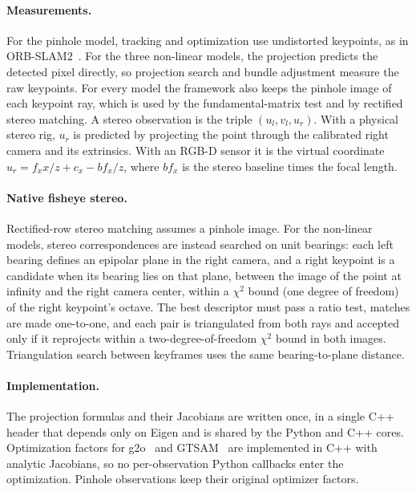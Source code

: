 \documentclass{article}
\let\oldparagraph\paragraph
\renewcommand{\paragraph}[1]{\oldparagraph{#1}\mbox{}}
\begin{document}
\paragraph{Measurements.} For the pinhole model, tracking and optimization use undistorted keypoints, as in ORB-SLAM2~\cite{ORB_SLAM2}. For the three non-linear models, the projection predicts the detected pixel directly, so projection search and bundle adjustment measure the raw keypoints. For every model the framework also keeps the pinhole image of each keypoint ray, which is used by the fundamental-matrix test and by rectified stereo matching. A stereo observation is the triple $(u_l, v_l, u_r)$. With a physical stereo rig, $u_r$ is predicted by projecting the point through the calibrated right camera and its extrinsics. With an RGB-D sensor it is the virtual coordinate $u_r = f_x x/z + c_x - b f_x / z$, where $b f_x$ is the stereo baseline times the focal length.

\paragraph{Native fisheye stereo.} Rectified-row stereo matching assumes a pinhole image. For the non-linear models, stereo correspondences are instead searched on unit bearings: each left bearing defines an epipolar plane in the right camera, and a right keypoint is a candidate when its bearing lies on that plane, between the image of the point at infinity and the right camera center, within a $\chi^2$ bound (one degree of freedom) of the right keypoint's octave. The best descriptor must pass a ratio test, matches are made one-to-one, and each pair is triangulated from both rays and accepted only if it reprojects within a two-degree-of-freedom $\chi^2$ bound in both images. Triangulation search between keyframes uses the same bearing-to-plane distance.

\paragraph{Implementation.} The projection formulas and their Jacobians are written once, in a single C++ header that depends only on Eigen and is shared by the Python and C++ cores. Optimization factors for g2o~\cite{g2o_kummerle} and GTSAM~\cite{factor_graphs_for_robot_perception} are implemented in C++ with analytic Jacobians, so no per-observation Python callbacks enter the optimization. Pinhole observations keep their original optimizer factors.
\end{document}
